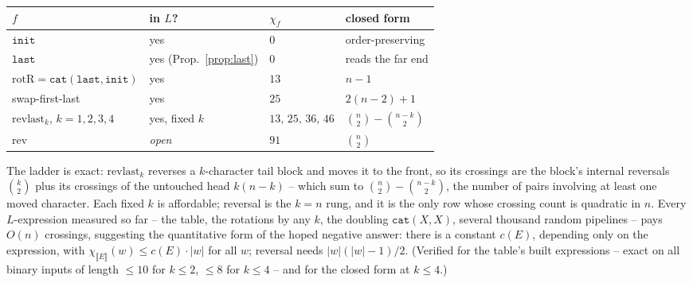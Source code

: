 \begin{remark}
    \begin{center}
        \small
        \begin{tabular}{llll}
            \hline
            $f$ & in $L$? & $\chi_f$ & closed form \\
            \hline
            $\mathtt{init}$ & yes & $0$ & order-preserving \\
            $\mathtt{last}$ & yes (Prop.~\ref{prop:last}) & $0$ & reads the far end \\
            $\mathrm{rotR} = \mathtt{cat}(\mathtt{last},\mathtt{init})$
                & yes & $13$ & $n-1$ \\
            swap-first-last & yes & $25$ & $2(n{-}2)+1$ \\
            $\mathrm{revlast}_k$, $k=1,2,3,4$ & yes, fixed $k$
                & $13,\,25,\,36,\,46$ & $\binom{n}{2}-\binom{n-k}{2}$ \\
            $\mathrm{rev}$ & \emph{open} & $91$ & $\binom{n}{2}$ \\
            \hline
        \end{tabular}
    \end{center}

    The ladder is exact: $\mathrm{revlast}_k$ reverses a $k$-character tail
    block and moves it to the front, so its crossings are the block's
    internal reversals $\binom{k}{2}$ plus its crossings of the untouched
    head $k(n-k)$ -- which sum to $\binom{n}{2} - \binom{n-k}{2}$, the
    number of pairs involving at least one moved character. Each fixed $k$
    is affordable; reversal is the $k = n$ rung, and it is the only row
    whose crossing count is quadratic in $n$. Every $L$-expression measured
    so far -- the table, the rotations by any $k$, the doubling
    $\mathtt{cat}(X,X)$, several thousand random pipelines -- pays
    $O(n)$ crossings, suggesting the quantitative form of the hoped
    negative answer: there is a constant $c(E)$, depending only on the
    expression, with $\chi_{\llbracket E \rrbracket}(w) \leq c(E)\cdot|w|$
    for all $w$; reversal needs $|w|(|w|{-}1)/2$. (Verified for the
    table's built expressions -- exact on all binary inputs of length
    $\leq 10$ for $k \leq 2$, $\leq 8$ for $k \leq 4$ -- and for the
    closed form at $k \leq 4$.)


\end{remark}

